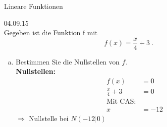 \documentclass[12pt,fleqn]{article}
\theoremstyle{aufg}
\theoremstyle{bsp}
\begin{document}
 
    \begin{flushleft}
\begin{center}Lineare Funktionen\end{center} 
 04.09.15 \\[2em]Gegeben ist die Funktion f mit\[f(x)=\frac{x}{4} + 3\; . \]\begin{enumerate}[a)] 
\item 
Bestimmen Sie die Nullstellen von $f$. \\ 
{\bf Nullstellen:} 
\begin{align*} 
f(x)&=0 \\ 
\frac{x}{4} + 3&=0 \\ 
\text{Mit CAS:} \\ 
x&=-12\end{align*} 
$\Rightarrow$ Nullstelle bei $N(-12|0)$ \\ 


\end{enumerate}
\end{flushleft}
\end{document}

